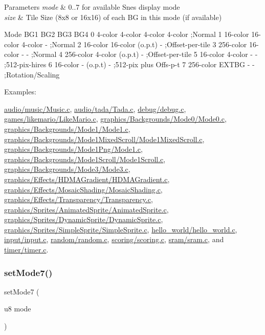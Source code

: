 \begin{DoxyParams}{Parameters}
{\em mode} & 0..7 for available Snes display mode \\
\hline
{\em size} & Tile Size (8x8 or 16x16) of each BG in this mode (if available)\\
\hline
\end{DoxyParams}
Mode B\+G1 B\+G2 B\+G3 B\+G4 0 4-\/color 4-\/color 4-\/color 4-\/color ;Normal 1 16-\/color 16-\/color 4-\/color -\/ ;Normal 2 16-\/color 16-\/color (o.\+p.\+t) -\/ ;Offset-\/per-\/tile 3 256-\/color 16-\/color -\/ -\/ ;Normal 4 256-\/color 4-\/color (o.\+p.\+t) -\/ ;Offset-\/per-\/tile 5 16-\/color 4-\/color -\/ -\/ ;512-\/pix-\/hires 6 16-\/color -\/ (o.\+p.\+t) -\/ ;512-\/pix plus Offs-\/p-\/t 7 256-\/color E\+X\+T\+BG -\/ -\/ ;Rotation/\+Scaling \begin{Desc}
\item[Examples\+: ]\par
\hyperlink{a00422}{audio/music/\+Music.\+c}, \hyperlink{a00424}{audio/tada/\+Tada.\+c}, \hyperlink{a00426}{debug/debug.\+c}, \hyperlink{a00420}{games/likemario/\+Like\+Mario.\+c}, \hyperlink{a00390}{graphics/\+Backgrounds/\+Mode0/\+Mode0.\+c}, \hyperlink{a00392}{graphics/\+Backgrounds/\+Mode1/\+Mode1.\+c}, \hyperlink{a00398}{graphics/\+Backgrounds/\+Mode1\+Mixed\+Scroll/\+Mode1\+Mixed\+Scroll.\+c}, \hyperlink{a00394}{graphics/\+Backgrounds/\+Mode1\+Png/\+Mode1.\+c}, \hyperlink{a00396}{graphics/\+Backgrounds/\+Mode1\+Scroll/\+Mode1\+Scroll.\+c}, \hyperlink{a00400}{graphics/\+Backgrounds/\+Mode3/\+Mode3.\+c}, \hyperlink{a00404}{graphics/\+Effects/\+H\+D\+M\+A\+Gradient/\+H\+D\+M\+A\+Gradient.\+c}, \hyperlink{a00406}{graphics/\+Effects/\+Mosaic\+Shading/\+Mosaic\+Shading.\+c}, \hyperlink{a00408}{graphics/\+Effects/\+Transparency/\+Transparency.\+c}, \hyperlink{a00412}{graphics/\+Sprites/\+Animated\+Sprite/\+Animated\+Sprite.\+c}, \hyperlink{a00414}{graphics/\+Sprites/\+Dynamic\+Sprite/\+Dynamic\+Sprite.\+c}, \hyperlink{a00410}{graphics/\+Sprites/\+Simple\+Sprite/\+Simple\+Sprite.\+c}, \hyperlink{a00388}{hello\+\_\+world/hello\+\_\+world.\+c}, \hyperlink{a00416}{input/input.\+c}, \hyperlink{a00428}{random/random.\+c}, \hyperlink{a00432}{scoring/scoring.\+c}, \hyperlink{a00430}{sram/sram.\+c}, and \hyperlink{a00418}{timer/timer.\+c}.\end{Desc}
\mbox{\label{a00353_af7e722fd2eba5682bc0eafa9d5a9c51a}} 
\subsubsection{\texorpdfstring{set\+Mode7()}{setMode7()}}
{\footnotesize\ttfamily set\+Mode7 (\begin{DoxyParamCaption}\item[{u8}]{mode }\end{DoxyParamCaption})}



